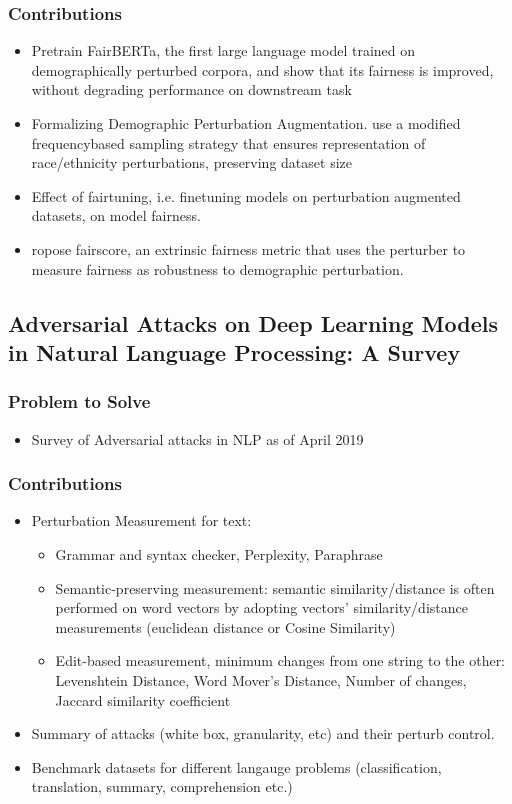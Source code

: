 \documentclass{article}
\begin{document}
\begin{flushleft}
\subsubsection*{Contributions}
\begin{itemize}
 \item  Pretrain FairBERTa, the first large language model trained on demographically perturbed corpora, and show that its fairness is improved, without degrading performance on downstream task
 \item Formalizing Demographic Perturbation Augmentation. use a modified frequencybased sampling strategy that ensures representation of race/ethnicity perturbations, preserving dataset size
 \item Effect of fairtuning, i.e. finetuning models on perturbation augmented datasets, on model fairness.
 \item ropose fairscore, an extrinsic fairness metric that uses the perturber to measure fairness as robustness to demographic perturbation.
\end{itemize}




\subsection{Adversarial Attacks on Deep Learning Models in Natural Language Processing: A Survey \cite{zhang2020adversarial}} 
\subsubsection*{Problem to Solve}
\begin{itemize}
    \item Survey of Adversarial attacks in NLP as of April 2019 
\end{itemize}

\subsubsection*{Contributions}
\begin{itemize}
  \item Perturbation Measurement for text: 
  \begin{itemize}
  \item Grammar and syntax checker, Perplexity, Paraphrase
  \item Semantic-preserving measurement: semantic similarity/distance is often performed on word vectors by adopting vectors’ similarity/distance measurements (euclidean distance or Cosine Similarity)
  \item Edit-based measurement, minimum changes from one string to the other: Levenshtein Distance, Word Mover’s Distance, Number of changes, Jaccard similarity coefficient
  \end{itemize}
  \item Summary of attacks (white box, granularity, etc) and their perturb control. 
  \item Benchmark datasets for different langauge problems (classification, translation, summary, comprehension etc.)
\end{itemize}


\end{flushleft}
\end{document}

